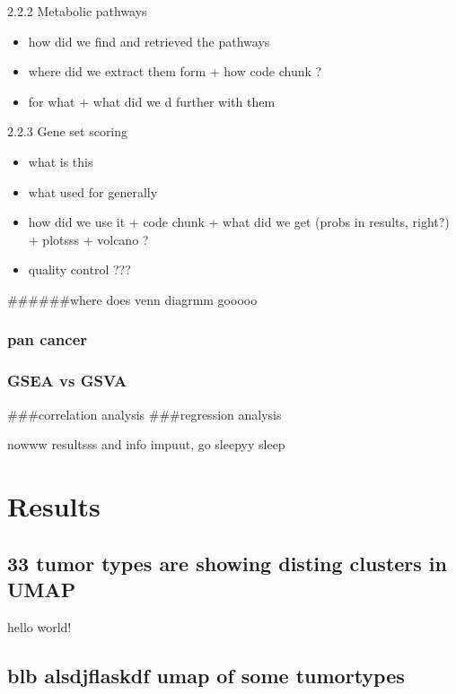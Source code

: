 \documentclass[
  parskip,
  oneside]{scrreprt}
\providecommand{\tightlist}{%
  \setlength{\itemsep}{0pt}\setlength{\parskip}{0pt}}
\begin{document}
2.2.2 Metabolic pathways

\begin{itemize}
\tightlist
\item
  how did we find and retrieved the pathways
\item
  where did we extract them form + how code chunk ?
\item
  for what + what did we d further with them
\end{itemize}

2.2.3 Gene set scoring

\begin{itemize}
\tightlist
\item
  what is this
\item
  what used for generally
\item
  how did we use it + code chunk + what did we get (probs in results,
  right?) + plotsss + volcano ?
\item
  quality control ???
\end{itemize}

\#\#\#\#\#\#where does venn diagrmm gooooo

\hypertarget{pan-cancer}{%
\subsection{pan cancer}\label{pan-cancer}}

\hypertarget{gsea-vs-gsva}{%
\subsection{GSEA vs GSVA}\label{gsea-vs-gsva}}

\#\#\#correlation analysis \#\#\#regression analysis

nowww resultsss and info impuut, go sleepyy sleep

\hypertarget{results}{%
\chapter{Results}\label{results}}

\hypertarget{tumor-types-are-showing-disting-clusters-in-umap}{%
\section{33 tumor types are showing disting clusters in
UMAP}\label{tumor-types-are-showing-disting-clusters-in-umap}}

hello world!

\hypertarget{blb-alsdjflaskdf-umap-of-some-tumortypes}{%
\section{blb alsdjflaskdf umap of some
tumortypes}\label{blb-alsdjflaskdf-umap-of-some-tumortypes}}
\end{document}
